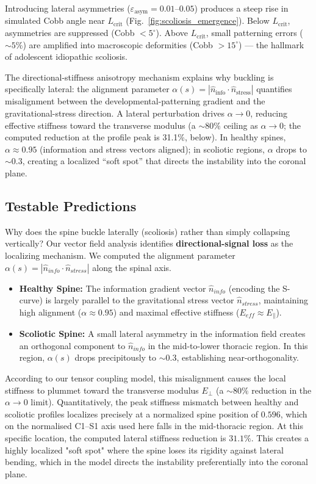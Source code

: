 Introducing lateral asymmetries ($\varepsilon_{\mathrm{asym}} = 0.01$--$0.05$) produces a steep rise in simulated Cobb angle near $L_{\mathrm{crit}}$ (Fig.~\ref{fig:scoliosis_emergence}). Below $L_{\mathrm{crit}}$, asymmetries are suppressed (Cobb $< 5^\circ$). Above $L_{\mathrm{crit}}$, small patterning errors (${\sim}5\%$) are amplified into macroscopic deformities (Cobb $> 15^\circ$) --- the hallmark of adolescent idiopathic scoliosis.

The directional-stiffness anisotropy mechanism explains why buckling is specifically lateral: the alignment parameter $\alpha(s) = |\hat{n}_{\mathrm{info}} \cdot \hat{n}_{\mathrm{stress}}|$ quantifies misalignment between the developmental-patterning gradient and the gravitational-stress direction. A lateral perturbation drives $\alpha \to 0$, reducing effective stiffness toward the transverse modulus (a ${\sim}80\%$ ceiling as $\alpha \to 0$; the computed reduction at the profile peak is 31.1\%, below). In healthy spines, $\alpha \approx 0.95$ (information and stress vectors aligned); in scoliotic regions, $\alpha$ drops to ${\sim}0.3$, creating a localized ``soft spot'' that directs the instability into the coronal plane.

\subsection{Testable Predictions}
Why does the spine buckle laterally (scoliosis) rather than simply collapsing vertically? Our vector field analysis identifies \textbf{directional-signal loss} as the localizing mechanism.
We computed the alignment parameter $\alpha(s) = |\hat{n}_{info} \cdot \hat{n}_{stress}|$ along the spinal axis.
\begin{itemize}
    \item \textbf{Healthy Spine:} The information gradient vector $\hat{n}_{info}$ (encoding the S-curve) is largely parallel to the gravitational stress vector $\hat{n}_{stress}$, maintaining high alignment ($\alpha \approx 0.95$) and maximal effective stiffness ($E_{eff} \approx E_{\parallel}$).
    \item \textbf{Scoliotic Spine:} A small lateral asymmetry in the information field creates an orthogonal component to $\hat{n}_{info}$ in the mid-to-lower thoracic region. In this region, $\alpha(s)$ drops precipitously to $\sim 0.3$, establishing near-orthogonality.
\end{itemize}
According to our tensor coupling model, this misalignment causes the local stiffness to plummet toward the transverse modulus $E_{\perp}$ (a $\sim 80\%$ reduction in the $\alpha \to 0$ limit). Quantitatively, the peak stiffness mismatch between healthy and scoliotic profiles localizes precisely at a normalized spine position of $0.596$, which on the normalised C1--S1 axis used here falls in the mid-thoracic region. At this specific location, the computed lateral stiffness reduction is $31.1\%$. This creates a highly localized "soft spot" where the spine loses its rigidity against lateral bending, which in the model directs the instability preferentially into the coronal plane.

